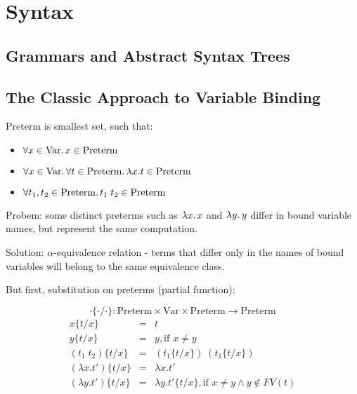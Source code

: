 \chapter{Syntax}

\section{Grammars and Abstract Syntax Trees}

\section{The Classic Approach to Variable Binding}

\newcommand\Preterm{\mathrm{Preterm}}
\newcommand\Var{\mathrm{Var}}
\newcommand\Subst[3]{#1\{#2/#3\}}

$\Preterm$ is smallest set, such that:

\begin{itemize}
\item $\forall x \in \Var\ldotp x \in \Preterm$
\item $\forall x \in \Var\ldotp\forall t \in \Preterm\ldotp \lambda x.t \in \Preterm$
\item $\forall t_1, t_2 \in \Preterm\ldotp t_1\;t_2 \in \Preterm$
\end{itemize}

Probem: some distinct preterms such as $\lambda x \ldotp x$ and $\lambda y \ldotp y$
differ in bound variable names, but represent the same computation.

Solution: $\alpha$-equivalence relation - terms that differ only in the
names of bound variables will belong to the same equivalence class.

But first, substitution on preterms (partial function):

\[
  \Subst{\cdot}{\cdot}{\cdot} \colon
  \Preterm \times \Var \times \Preterm \to \Preterm
\]
\begin{eqnarray*}
  \Subst{x}{t}{x}          & = & t \\
  \Subst{y}{t}{x}          & = & y, \text{if } x \ne y \\
  \Subst{(t_1\;t_2)}{t}{x} & = & (\Subst{t_1}{t}{x})\;(\Subst{t_1}{t}{x}) \\
  \Subst{(\lambda x.t')}{t}{x} & = & \lambda x.t' \\
  \Subst{(\lambda y.t')}{t}{x} & = & \lambda y.\Subst{t'}{t}{x}, \text{if } x \ne y \land y \not\in FV(t)
\end{eqnarray*}

